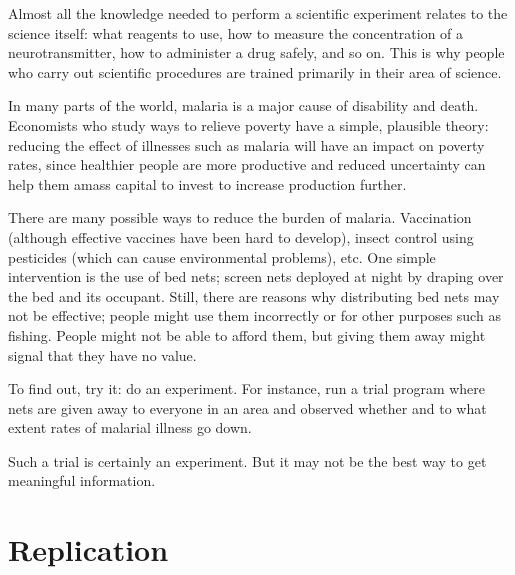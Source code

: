 \documentclass[
  letterpaper,
  DIV=11,
  numbers=noendperiod,
  oneside]{scrreprt}
\begin{document}
Almost all the knowledge needed to perform a scientific experiment
relates to the science itself: what reagents to use, how to measure the
concentration of a neurotransmitter, how to administer a drug safely,
and so on. This is why people who carry out scientific procedures are
trained primarily in their area of science.

\begin{tcolorbox}[enhanced jigsaw, colbacktitle=quarto-callout-note-color!10!white, breakable, opacitybacktitle=0.6, colback=white, left=2mm, arc=.35mm, colframe=quarto-callout-note-color-frame, coltitle=black, toprule=.15mm, opacityback=0, leftrule=.75mm, bottomtitle=1mm, toptitle=1mm, titlerule=0mm, title=\textcolor{quarto-callout-note-color}{\faInfo}\hspace{0.5em}{Example: Malaria and bed nets}, rightrule=.15mm, bottomrule=.15mm]

In many parts of the world, malaria is a major cause of disability and
death. Economists who study ways to relieve poverty have a simple,
plausible theory: reducing the effect of illnesses such as malaria will
have an impact on poverty rates, since healthier people are more
productive and reduced uncertainty can help them amass capital to invest
to increase production further.

There are many possible ways to reduce the burden of malaria.
Vaccination (although effective vaccines have been hard to develop),
insect control using pesticides (which can cause environmental
problems), etc. One simple intervention is the use of bed nets; screen
nets deployed at night by draping over the bed and its occupant. Still,
there are reasons why distributing bed nets may not be effective; people
might use them incorrectly or for other purposes such as fishing. People
might not be able to afford them, but giving them away might signal that
they have no value.

To find out, try it: do an experiment. For instance, run a trial program
where nets are given away to everyone in an area and observed whether
and to what extent rates of malarial illness go down.

Such a trial is certainly an experiment. But it may not be the best way
to get meaningful information.

\end{tcolorbox}

\hypertarget{replication}{%
\section{Replication}\label{replication}}
\end{document}
